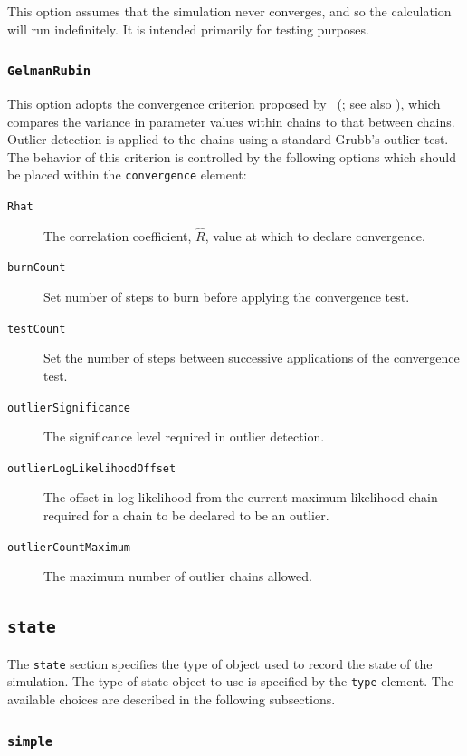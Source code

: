 This option assumes that the simulation never converges, and so the calculation will run indefinitely. It is intended primarily for testing purposes.

\subsubsection{{\tt GelmanRubin}}

This option adopts the convergence criterion proposed by \citeauthor{gelman_a._inference_1992}~(\citeyear{gelman_a._inference_1992}; see also \citealt{brooks_general_1998}), which compares the variance in parameter values within chains to that between chains. Outlier detection is applied to the chains using a standard Grubb's outlier test. The behavior of this criterion is controlled by the following options which should be placed within the {\tt convergence} element:
\begin{description}
\item [{\tt Rhat}] The correlation coefficient, $\hat{R}$, value at which to declare convergence.
\item [{\tt burnCount}] Set number of steps to burn before applying the convergence test.
\item [{\tt testCount}] Set the number of steps between successive applications of the convergence test.
\item [{\tt outlierSignificance}] The significance level required in outlier detection.
\item [{\tt outlierLogLikelihoodOffset}] The offset in log-likelihood from the current maximum likelihood chain required for a chain to be declared to be an outlier.
\item [{\tt outlierCountMaximum}] The maximum number of outlier chains allowed.
\end{description}

\subsection{{\tt state}}

The {\tt state} section specifies the type of object used to record the state of the simulation. The type of state object to use is specified by the {\tt type} element. The available choices are described in the following subsections.

\subsubsection{{\tt simple}}

